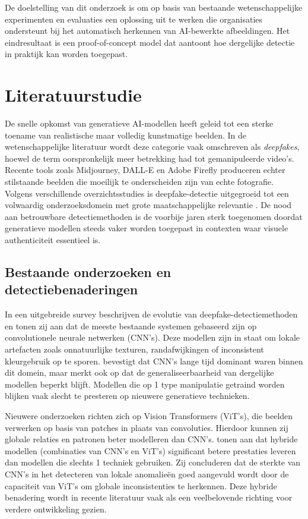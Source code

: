 \documentclass{hogent-article}
\begin{document}
De doelstelling van dit onderzoek is om op basis van bestaande wetenschappelijke experimenten en evaluaties een oplossing uit te werken die organisaties ondersteunt bij het automatisch herkennen van AI-bewerkte afbeeldingen. Het eindresultaat is een proof-of-concept model dat aantoont hoe dergelijke detectie in praktijk kan worden toegepast. 

\section{Literatuurstudie}%
\label{sec:literatuurstudie}
De snelle opkomst van generatieve AI-modellen heeft geleid tot een sterke toename van realistische maar volledig kunstmatige beelden. In de wetenschappelijke literatuur wordt deze categorie vaak omschreven als \emph{deepfakes}, hoewel de term oorspronkelijk meer betrekking had tot gemanipuleerde video's. Recente tools zoals Midjourney, DALL-E en Adobe Firefly produceren echter stilstaande beelden die moeilijk te onderscheiden zijn van echte fotografie. Volgens verschillende overzichtsstudies is deepfake-detectie uitgegroeid tot een volwaardig onderzoeksdomein met grote maatschappelijke relevantie \autocite{Gong2024}. De nood aan betrouwbare detectiemethoden is de voorbije jaren sterk toegenomen doordat generatieve modellen steeds vaker worden toegepast in contexten waar visuele authenticiteit essentieel is.

\subsection{Bestaande onderzoeken en detectiebenaderingen}
In een uitgebreide survey beschrijven \textcite{Gong2024} de evolutie van deepfake-detectiemethoden en tonen zij aan dat de meeste bestaande systemen gebaseerd zijn op convolutionele neurale netwerken (CNN's). Deze modellen zijn in staat om lokale artefacten zoals onnatuurlijke texturen, randafwijkingen of inconsistent kleurgebruik op te sporen. \textcite{Akhtar2023} bevestigt dat CNN's lange tijd dominant waren binnen dit domein, maar merkt ook op dat de generaliseerbaarheid van dergelijke modellen beperkt blijft. Modellen die op 1 type manipulatie getraind worden blijken vaak slecht te presteren op nieuwere generatieve technieken.

Nieuwere onderzoeken richten zich op Vision Transformers (ViT's), die beelden verwerken op basis van patches in plaats van convoluties. Hierdoor kunnen zij globale relaties en patronen beter modelleren dan CNN's. \textcite{Zhou2024} tonen aan dat hybride modellen (combinaties van CNN's en ViT's) significant betere prestaties leveren dan modellen die slechts 1 techniek gebruiken. Zij concluderen dat de sterkte van CNN's in het detecteren van lokale anomalieën goed aangevuld wordt door de capaciteit van ViT's om globale inconsistenties te herkennen. Deze hybride benadering wordt in recente literatuur vaak als een veelbelovende richting voor verdere ontwikkeling gezien.
\end{document}
